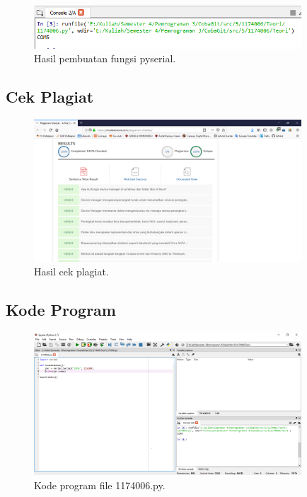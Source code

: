 

\begin{figure}[H]
	\includegraphics[width=10cm]{figures/5/1174006/Teori/hasil.png}
	\centering
	\caption{Hasil pembuatan fungsi pyserial.}
\end{figure}

\subsection{Cek Plagiat}
\begin{figure}[H]
	\includegraphics[width=10cm]{figures/5/1174006/Teori/plagiat.png}
	\centering
	\caption{Hasil cek plagiat.}
\end{figure}

\subsection{Kode Program}
\begin{figure}[H]
	\includegraphics[width=10cm]{figures/5/1174006/Teori/kodeprogram.png}
	\centering
	\caption{Kode program file 1174006.py.}
\end{figure}

